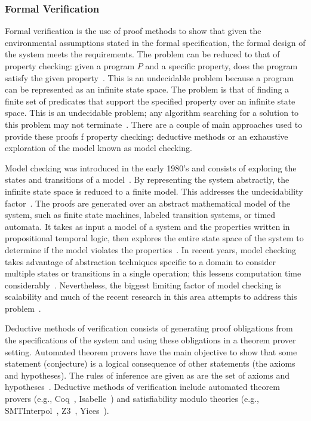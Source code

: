 \subsubsection{Formal Verification} 
Formal verification is the use of proof methods to show that given the environmental assumptions stated in the formal specification, the formal design of the system meets the requirements. The problem can be reduced to that of property checking: given a program $P$ and a specific property, does the program satisfy the given property~\cite{fitting2012first}. This is an undecidable problem because a program can be represented as an infinite state space. The problem is that of finding a finite set of predicates that support the specified property over an infinite state space. This is an undecidable problem; any algorithm searching for a solution to this problem may not terminate~\cite{clarke2018model}. There are a couple of main approaches used to provide these proofs f property checking: deductive methods or an exhaustive exploration of the model known as model checking. 

Model checking was introduced in the early 1980's and consists of exploring the states and transitions of a model~\cite{clarke1981design,queille1982specification}. By representing the system abstractly, the infinite state space is reduced to a finite model. This addresses the undecidability factor~\cite{d2008survey}. The proofs are generated over an abstract mathematical model of the system, such as finite state machines, labeled transition systems, or timed automata. It takes as input a model of a system and the properties written in propositional temporal logic, then explores the entire state space of the system to determine if the model violates the properties~\cite{clarke2018model,fraser2009testing}. In recent years, model checking takes advantage of abstraction techniques specific to a domain to consider multiple states or transitions in a single operation; this lessens computation time considerably~\cite{d2008survey}. Nevertheless, the biggest limiting factor of model checking is scalability and much of the recent research in this area attempts to address this problem~\cite{clarke2018model}.

Deductive methods of verification consists of generating proof obligations from the specifications of the system and using these obligations in a theorem prover setting. Automated theorem provers have the main objective to show that some statement (conjecture) is a logical consequence of other statements (the axioms and hypotheses). The rules of inference are given as are the set of axioms and hypotheses~\cite{d2008survey,fitting2012first}. Deductive methods of verification include automated theorem provers (e.g., Coq~\cite{coq}, Isabelle~\cite{isabelle}) and satisfiability modulo theories (e.g., SMTInterpol~\cite{smtInterpol}, Z3~\cite{z3}, Yices~\cite{yices}). 


